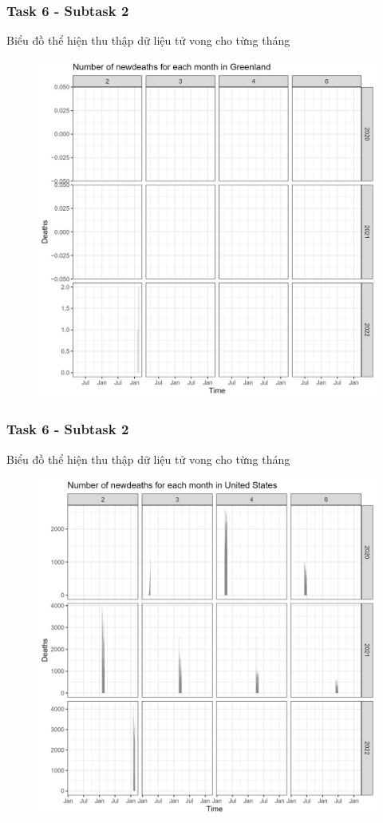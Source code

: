 \documentclass[english,10pt,table]{beamer}
\begin{document}
\frame
{
    \frametitle{Task 6 - Subtask 2}
    \begin{block}{Biểu đồ thể hiện thu thập dữ liệu tử vong cho từng tháng}
    \begin{figure}[H]
		\centering
		\includegraphics[scale=0.11]{images/6.2.2.png}
	\end{figure}
    \end{block}
}
\frame
{
    \frametitle{Task 6 - Subtask 2}
    \begin{block}{Biểu đồ thể hiện thu thập dữ liệu tử vong cho từng tháng}
    \begin{figure}[H]
		\centering
		\includegraphics[scale=0.11]{images/6.2.3.png}
	\end{figure}
    \end{block}
}
\end{document}
